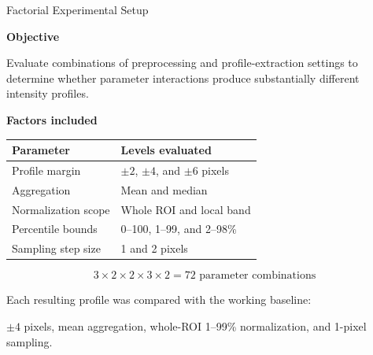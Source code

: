 \documentclass[aspectratio=169]{beamer}
\begin{document}
\begin{frame}{Factorial Experimental Setup}

\textbf{Objective}

Evaluate combinations of preprocessing and profile-extraction settings to
determine whether parameter interactions produce substantially different
intensity profiles.

\vspace{0.25cm}

\textbf{Factors included}

\begin{table}
\centering
\small
\begin{tabular}{ll}
\toprule
Parameter & Levels evaluated\\
\midrule
Profile margin & $\pm2$, $\pm4$, and $\pm6$ pixels\\
Aggregation & Mean and median\\
Normalization scope & Whole ROI and local band\\
Percentile bounds & 0--100, 1--99, and 2--98\%\\
Sampling step size & 1 and 2 pixels\\
\bottomrule
\end{tabular}
\end{table}

\vspace{0.25cm}

\[
3 \times 2 \times 2 \times 3 \times 2
=
72 \text{ parameter combinations}
\]

Each resulting profile was compared with the working baseline:

\begin{center}
$\pm4$ pixels, mean aggregation, whole-ROI 1--99\% normalization,
and 1-pixel sampling.
\end{center}

\end{frame}
\end{document}
